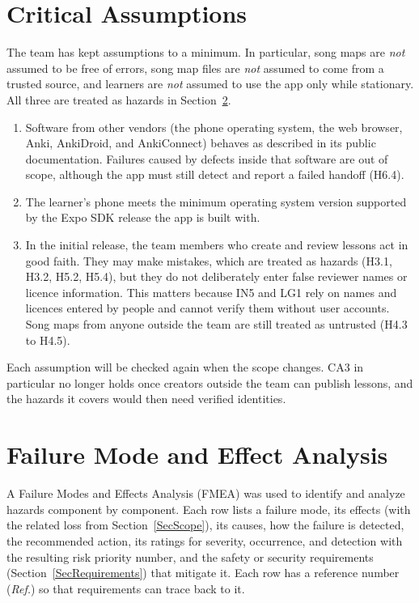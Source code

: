 \documentclass{article}
\begin{document}
\section{Critical Assumptions} \label{SecAssumptions}

The team has kept assumptions to a minimum. In particular, song maps are
\emph{not} assumed to be free of errors, song map files are \emph{not}
assumed to come from a trusted source, and learners are \emph{not} assumed to
use the app only while stationary. All three are treated as hazards in
Section~\ref{SecFMEA}.

\begin{enumerate}
  \item[CA1:] Software from other vendors (the phone operating system, the web
        browser, Anki, AnkiDroid, and AnkiConnect) behaves as described in its
        public documentation. Failures caused by defects inside that software
        are out of scope, although the app must still detect and report a
        failed handoff (H6.4).
  \item[CA2:] The learner's phone meets the minimum operating system version
        supported by the Expo SDK release the app is built with.
  \item[CA3:] In the initial release, the team members who create and review
        lessons act in good faith. They may make mistakes, which are treated
        as hazards (H3.1, H3.2, H5.2, H5.4), but they do not deliberately
        enter false reviewer names or licence information. This matters
        because IN5 and LG1 rely on names and licences entered by people and
        cannot verify them without user accounts. Song maps from anyone
        outside the team are still treated as untrusted (H4.3 to H4.5).
\end{enumerate}

Each assumption will be checked again when the scope changes. CA3 in
particular no longer holds once creators outside the team can publish
lessons, and the hazards it covers would then need verified identities.

\section{Failure Mode and Effect Analysis} \label{SecFMEA}

A Failure Modes and Effects Analysis (FMEA) was used to identify and analyze
hazards component by component. Each row lists a failure mode, its effects
(with the related loss from Section~\ref{SecScope}), its causes, how the
failure is detected, the recommended action, its ratings for severity,
occurrence, and detection with the resulting risk priority number, and the
safety or security requirements (Section~\ref{SecRequirements}) that mitigate
it. Each
row has a reference number (\emph{Ref.}) so that requirements can trace back
to it.
\end{document}
